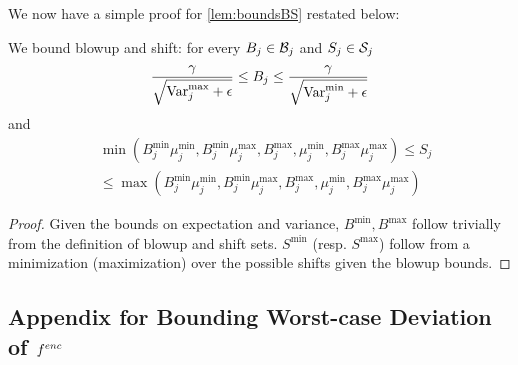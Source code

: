 We now have a simple proof for \cref{lem:boundsBS} restated below:
\begin{lemma}
	We bound blowup and shift: for every $B_j \in \mathcal{B}_j$ and $S_j \in \mathcal{S}_j$
	\[
		\frac{\gamma}{\sqrt{\mathrm{Var}_j^{\max} + \epsilon}} \leq B_j \leq \frac{\gamma}{\sqrt{\mathrm{Var}_j^{\min} + \epsilon}}
	\]
	and
	\begin{align*}
	&\min\left(B_j^{\min} \mu_j^{\min}, B_j^{\min} \mu_j^{\max}, B_j^{\max}, \mu_j^{\min}, B_j^{\max} \mu_j^{\max}\right)
	\leq
	S_j\\
	&\leq
	\max\left(B_j^{\min} \mu_j^{\min}, B_j^{\min} \mu_j^{\max}, B_j^{\max}, \mu_j^{\min}, B_j^{\max} \mu_j^{\max}\right)
	\end{align*}
\end{lemma}
\begin{proof}
	Given the bounds on expectation and variance, $B^{\min}, B^{\max}$ follow trivially from the definition of blowup and shift sets.
	$S^{\min}$ (resp. $S^{\max}$) follow from a minimization (maximization) over the possible shifts given the blowup bounds.
\end{proof}

\subsection{Appendix for Bounding Worst-case Deviation of $f^{enc}$}
\label{sec:appConcrcase}

